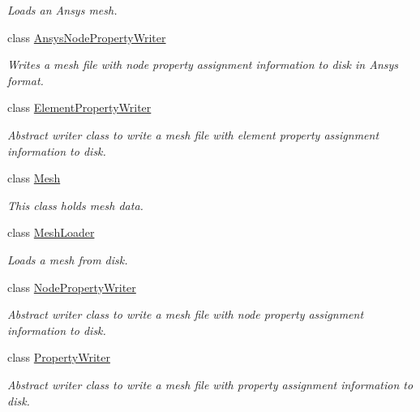 \begin{DoxyCompactItemize}
\begin{DoxyCompactList}\small\item\em Loads an Ansys mesh. \item\end{DoxyCompactList}\item 
class \hyperlink{classmesh_1_1_ansys_node_property_writer}{AnsysNodePropertyWriter}
\begin{DoxyCompactList}\small\item\em Writes a mesh file with node property assignment information to disk in Ansys format. \item\end{DoxyCompactList}\item 
class \hyperlink{classmesh_1_1_element_property_writer}{ElementPropertyWriter}
\begin{DoxyCompactList}\small\item\em Abstract writer class to write a mesh file with element property assignment information to disk. \item\end{DoxyCompactList}\item 
class \hyperlink{classmesh_1_1_mesh}{Mesh}
\begin{DoxyCompactList}\small\item\em This class holds mesh data. \item\end{DoxyCompactList}\item 
class \hyperlink{classmesh_1_1_mesh_loader}{MeshLoader}
\begin{DoxyCompactList}\small\item\em Loads a mesh from disk. \item\end{DoxyCompactList}\item 
class \hyperlink{classmesh_1_1_node_property_writer}{NodePropertyWriter}
\begin{DoxyCompactList}\small\item\em Abstract writer class to write a mesh file with node property assignment information to disk. \item\end{DoxyCompactList}\item 
class \hyperlink{classmesh_1_1_property_writer}{PropertyWriter}
\begin{DoxyCompactList}\small\item\em Abstract writer class to write a mesh file with property assignment information to disk. \item\end{DoxyCompactList}\end{DoxyCompactItemize}
